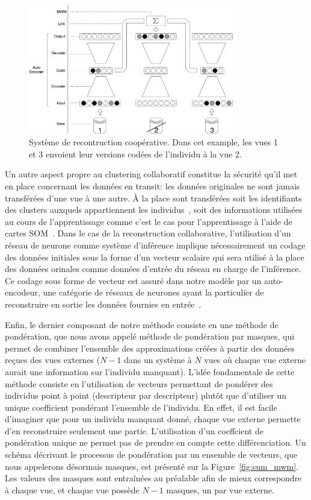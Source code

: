 \documentclass[a4paper]{article}
\begin{document}
	\begin{figure}[H]
		\centering
        \includegraphics[width=0.8\textwidth]{img/base_system.pdf}
        \caption{Système de recontruction coopérative. Dans cet example, les vues 1 et 3 envoient leur versions codées de l'individu à la vue 2.}
\label{fig:sum_base}
	\end{figure}

    Un autre aspect propre au clustering collaboratif constitue la sécurité qu'il met en place concernant les données en transit: les données originales ne sont jamais transférées d'une vue à une autre. À la place sont transférées soit les identifiants des clusters auxquels appartiennent les individus~\cite{sublime2016collaborative,Sublime2015}, soit des informations utilisées au cours de l'apprentissage comme c'est le cas pour l'apprentissage à l'aide de cartes SOM~\cite{ghassany2012collaborative,maurel2017incremental}. Dans le cas de la reconstruction collaborative, l'utilisation d'un réseau de neurone comme système d'inférence implique nécessairement un codage des données initiales sous la forme d'un vecteur scalaire qui sera utilisé à la place des données orinales comme données d'entrée du réseau en charge de l'inférence. Ce codage sous forme de vecteur est assuré dans notre modèle par un auto-encodeur, une catégorie de réseaux de neurones ayant la particulier de reconstruire en sortie les données fournies en entrée~\cite{vincent2008extracting}. 

    Enfin, le dernier composant de notre méthode consiste en une méthode de pondération, que nous avons appelé méthode de pondération par masques, qui permet de combiner l'ensemble des approximations créées à partir des données reçues des vues externes ($N-1$ dans un système à $N$ vues où chaque vue externe aurait une information sur l'individu manquant). L'idée fondamentale de cette méthode consiste en l'utilisation de vecteurs permettant de pondérer des individus point à point (descripteur par descripteur) plutôt que d'utiliser un unique coefficient pondérant l'ensemble de l'individu. En effet, il est facile d'imaginer que pour un individu manquant donné, chaque vue externe permette d'en reconstruire seulement une partie. L'utilisation d'un coeffcient de pondération unique ne permet pas de prendre en compte cette différenciation. Un schéma décrivant le processus de pondération par un ensemble de vecteurs, que nous appelerons désormais masques, est présenté sur la Figure~\ref{fig:sum_mwm}. Les valeurs des masques sont entraînées au préalable afin de mieux correspondre à chaque vue, et chaque vue possède $N-1$ masques, un par vue externe.
\end{document}
